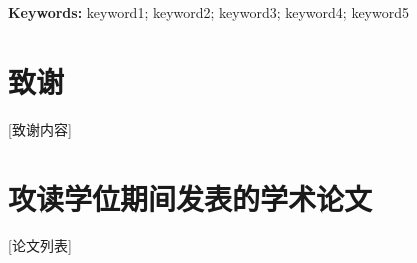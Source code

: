 \documentclass[12pt,a4paper,openany]{ctexbook}
\begin{document}
\vspace{1em}
\noindent\textbf{Keywords:} keyword1; keyword2; keyword3; keyword4; keyword5

\tableofcontents
\listoffigures
\listoftables

\mainmatter










\backmatter

\chapter*{致\hspace{2em}谢}
[致谢内容]

\chapter*{攻读学位期间发表的学术论文}
[论文列表]

\appendix

\end{document}
